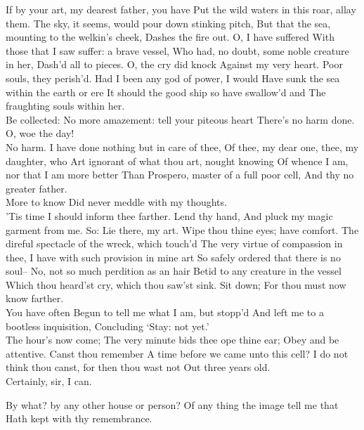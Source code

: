 \documentclass[11pt]{book}
\begin{document}
\2	If by your art, my dearest father, you have   
	Put the wild waters in this roar, allay them.
	The sky, it seems, would pour down stinking pitch,
	But that the sea, mounting to the welkin's cheek,
	Dashes the fire out. O, I have suffered
	With those that I saw suffer: a brave vessel,
	Who had, no doubt, some noble creature in her,
	Dash'd all to pieces. O, the cry did knock
	Against my very heart. Poor souls, they perish'd.
	Had I been any god of power, I would
	Have sunk the sea within the earth or ere
	It should the good ship so have swallow'd and
	The fraughting souls within her. \\

\1	Be collected:
	No more amazement: tell your piteous heart
	There's no harm done.  \\
\2	O, woe the day! \\
\1	No harm.
	I have done nothing but in care of thee,
	Of thee, my dear one, thee, my daughter, who
	Art ignorant of what thou art, nought knowing
	Of whence I am, nor that I am more better
	Than Prospero, master of a full poor cell,
	And thy no greater father. \\

\2	More to know
	Did never meddle with my thoughts. \\

\1	'Tis time  
	I should inform thee farther. Lend thy hand,
	And pluck my magic garment from me. So:
	Lie there, my art. Wipe thou thine eyes; have comfort.
	The direful spectacle of the wreck, which touch'd
	The very virtue of compassion in thee,
	I have with such provision in mine art
	So safely ordered that there is no soul--
	No, not so much perdition as an hair
	Betid to any creature in the vessel
	Which thou heard'st cry, which thou saw'st sink. Sit down;
	For thou must now know farther. \\

\2	You have often
	Begun to tell me what I am, but stopp'd
	And left me to a bootless inquisition,
	Concluding `Stay: not yet.' \\

\1	The hour's now come;
	The very minute bids thee ope thine ear;
	Obey and be attentive. Canst thou remember
	A time before we came unto this cell?
	I do not think thou canst, for then thou wast not
	Out three years old. \\

\2	Certainly, sir, I can.

\1	By what? by any other house or person?
	Of any thing the image tell me that
	Hath kept with thy remembrance. \\
\end{document}

